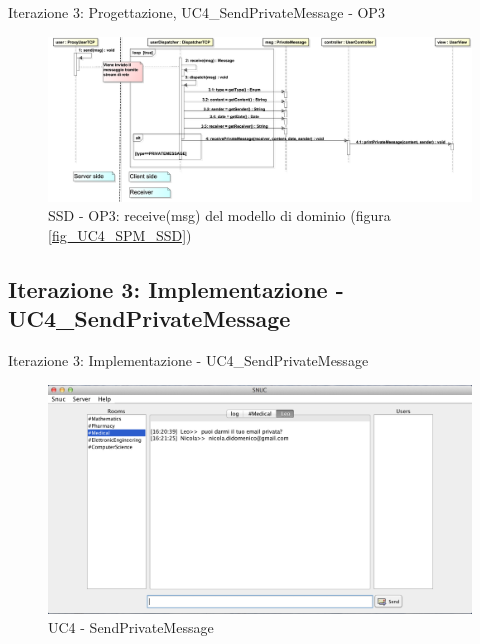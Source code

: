 \begin{frame} {Iterazione 3: Progettazione, UC4\_SendPrivateMessage - OP3}
   \begin{figure}
     \includegraphics[scale=0.14]{image_astah/Iteration_3_DesignModel/UC4_SendPrivateMessage_SSD_3_receive.png}{\centering}
     \caption{SSD - OP3: receive(msg) del modello di dominio (figura \ref{fig_UC4_SPM_SSD})}
     \label{fig_UC4_SSD_SRM_3} 
   \end{figure}
\end{frame}


\subsection {Iterazione 3: Implementazione - UC4\_SendPrivateMessage}
\begin{frame} {Iterazione 3: Implementazione - UC4\_SendPrivateMessage}
    \begin{figure}
    \includegraphics[scale=0.32]{image_implementation/uc4/10.png}{\centering}
    \caption{UC4 - SendPrivateMessage }
   \end{figure}
\end{frame}

